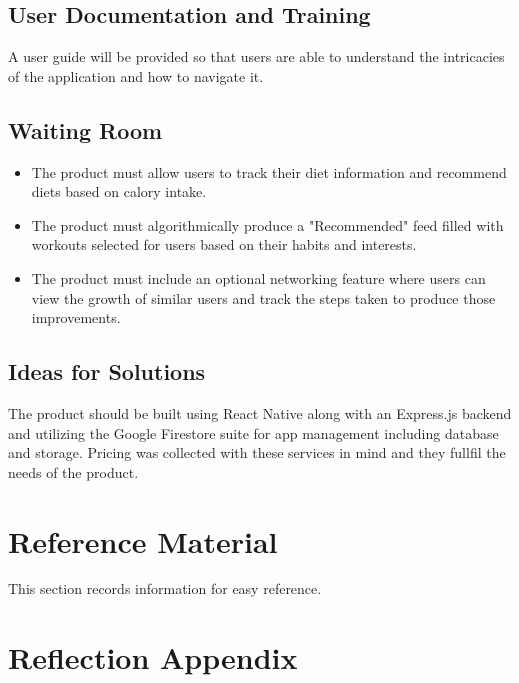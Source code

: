 \documentclass[12pt]{article}
\begin{document}
		\subsection{User Documentation and Training}
			A user guide will be provided so that users are able to understand the intricacies of the application and how to navigate it.
		\subsection{Waiting Room}
			\begin{itemize}
			\item The product must allow users to track their diet information and recommend diets based on calory intake.
			\item The product must algorithmically produce a "Recommended" feed filled with workouts selected for users based on their habits and interests.
			\item The product must include an optional networking feature where users can view the growth of similar users and track the steps taken to produce those improvements.
			\end{itemize}
		\subsection{Ideas for Solutions}
			The product should be built using React Native along with an Express.js backend and utilizing the Google Firestore suite for app management including database and storage. Pricing was collected with these services in mind and they fullfil the needs of the product.

	
	
	
	\section{Reference Material}
	
	This section records information for easy reference.
	
	
	
	
	\renewcommand{\arraystretch}{1.2}
	
	\newpage{}
	\section{Reflection Appendix}
\end{document}
